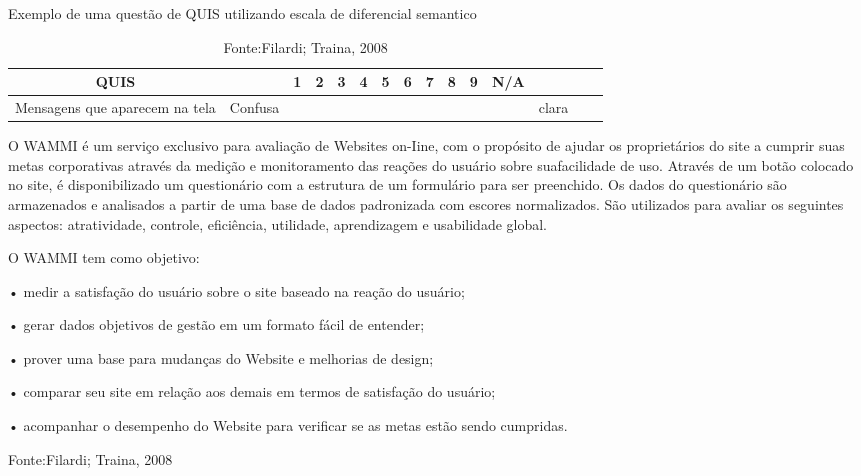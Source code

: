 \begin{table}
{Exemplo de uma questão de QUIS utilizando escala de diferencial semantico}
\centering
\begin{tabular}{|c|c|c|c|c|c|c|c|c|c|c|c|c|c|c|} 

\hline
   QUIS &  & 1 & 2 & 3 & 4 & 5 & 6 & 7 & 8 & 9 & N/A &  \\
\hline
Mensagens que aparecem na tela & Confusa &  &  &  &  &  &  &  &  &  &  & clara \\ 

\hline
\end{tabular}
\caption {Fonte:Filardi; Traina, 2008}

\end{table}

	O WAMMI é um serviço exclusivo para avaliação de
Websites on-Iine, com o propósito de ajudar os proprietários
do site a cumprir suas metas corporativas através da
medição e monitoramento das reações do usuário sobre
suafacilidade de uso. Através de um botão colocado no site,
é disponibilizado um questionário com a estrutura de um
formulário para ser preenchido. Os dados do questionário
são armazenados e analisados a partir de uma base de dados
padronizada com escores normalizados. São utilizados para
avaliar os seguintes aspectos: atratividade, controle,
eficiência, utilidade, aprendizagem e usabilidade global.
	
	O WAMMI tem como objetivo: 

• medir a satisfação do usuário sobre o site baseado na
reação do usuário;

• gerar dados objetivos de gestão em um formato fácil de
entender;

• prover uma base para mudanças do Website e melhorias
de design;

• comparar seu site em relação aos demais em termos de
satisfação do usuário; 

• acompanhar o desempenho do Website para verificar se
as metas estão sendo cumpridas.

Fonte:Filardi; Traina, 2008